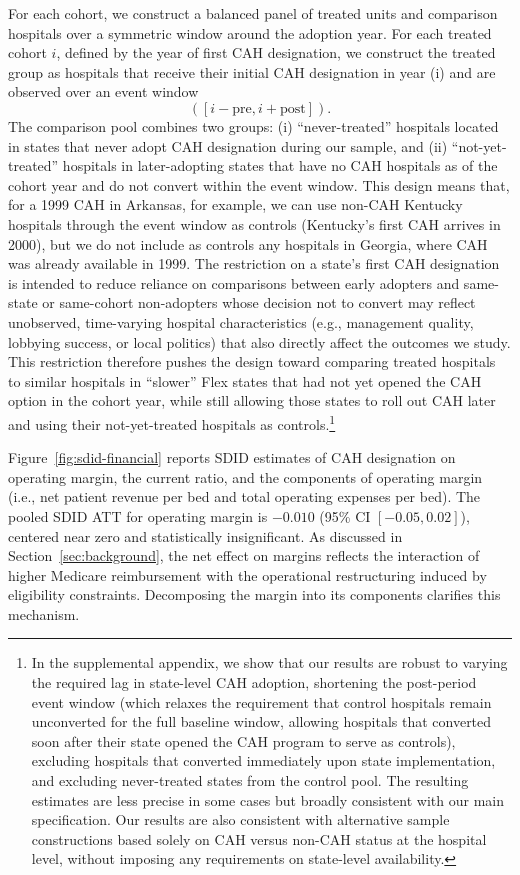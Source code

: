 \documentclass[a4paper, 12pt, twoside]{article}
\begin{document}
For each cohort, we construct a balanced panel of treated units and comparison hospitals over a symmetric window around the adoption year. For each treated cohort $i$, defined by the year of first CAH designation, we construct the treated group as hospitals that receive their initial CAH designation in year (i) and are observed over an event window $$([i-\text{pre}, i+\text{post}]).$$ The comparison pool combines two groups: (i) ``never-treated'' hospitals located in states that never adopt CAH designation during our sample, and (ii) ``not-yet-treated'' hospitals in later-adopting states that have no CAH hospitals as of the cohort year and do not convert within the event window. This design means that, for a 1999 CAH in Arkansas, for example, we can use non-CAH Kentucky hospitals through the event window as controls (Kentucky’s first CAH arrives in 2000), but we do not include as controls any hospitals in Georgia, where CAH was already available in 1999. The restriction on a state's first CAH designation is intended to reduce reliance on comparisons between early adopters and same-state or same-cohort non-adopters whose decision not to convert may reflect unobserved, time-varying hospital characteristics (e.g., management quality, lobbying success, or local politics) that also directly affect the outcomes we study. This restriction therefore pushes the design toward comparing treated hospitals to similar hospitals in ``slower'' Flex states that had not yet opened the CAH option in the cohort year, while still allowing those states to roll out CAH later and using their not-yet-treated hospitals as controls.\footnote{In the supplemental appendix, we show that our results are robust to varying the required lag in state-level CAH adoption, shortening the post-period event window (which relaxes the requirement that control hospitals remain unconverted for the full baseline window, allowing hospitals that converted soon after their state opened the CAH program to serve as controls), excluding hospitals that converted immediately upon state implementation, and excluding never-treated states from the control pool. The resulting estimates are less precise in some cases but broadly consistent with our main specification. Our results are also consistent with alternative sample constructions based solely on CAH versus non-CAH status at the hospital level, without imposing any requirements on state-level availability.}

Figure~\ref{fig:sdid-financial} reports SDID estimates of CAH designation on operating margin, the current ratio, and the components of operating margin (i.e., net patient revenue per bed and total operating expenses per bed). The pooled SDID ATT for operating margin is $-0.010$ (95\% CI $[-0.05, 0.02]$), centered near zero and statistically insignificant. As discussed in Section~\ref{sec:background}, the net effect on margins reflects the interaction of higher Medicare reimbursement with the operational restructuring induced by eligibility constraints. Decomposing the margin into its components clarifies this mechanism.
\end{document}
